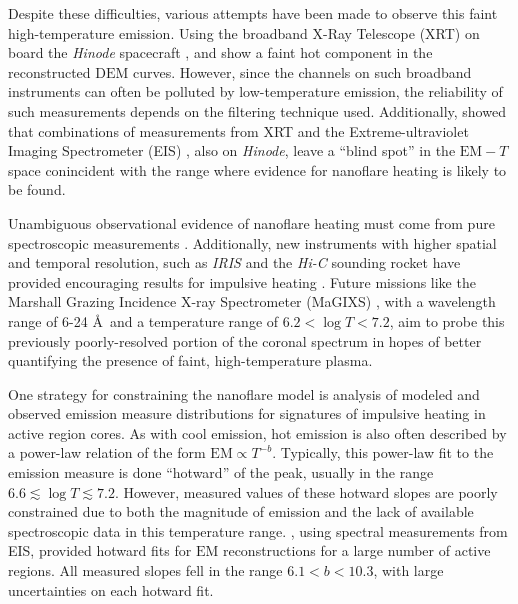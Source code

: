 \documentclass[apj]{emulateapj}
\newcommand{\ang}{\AA~}
\begin{document}
	\par Despite these difficulties, various attempts have been made to observe this faint high-temperature emission. Using the broadband X-Ray Telescope (XRT) \citep{golub_x-ray_2007} on board the \textit{Hinode} spacecraft \citep{kosugi_hinode_2007}, \citet{schmelz_hinode_2009} and \citet{reale_evidence_2009} show a faint hot component in the reconstructed $\mathrm{DEM}$ curves. However, since the channels on such broadband instruments can often be polluted by low-temperature emission, the reliability of such measurements depends on the filtering technique used. Additionally, \citet{winebarger_defining_2012} showed that combinations of measurements from XRT and the Extreme-ultraviolet Imaging Spectrometer (EIS) \citep{culhane_euv_2007}, also on  \textit{Hinode}, leave a ``blind spot'' in the $\mathrm{EM}-T$ space conincident with the range where evidence for nanoflare heating is likely to be found. 
	\par Unambiguous observational evidence of nanoflare heating must come from pure spectroscopic measurements \citep[see][]{brosius_pervasive_2014}. Additionally, new instruments with higher spatial and temporal resolution, such as \textit{IRIS} \citep{de_pontieu_interface_2014} and the \textit{Hi-C} sounding rocket \citep{cirtain_energy_2013} have provided encouraging results for impulsive heating \citep{testa_observing_2013,testa_evidence_2014}. Future missions like the Marshall Grazing Incidence X-ray Spectrometer (MaGIXS) \citep{kobayashi_marshall_2011,winebarger_new_2014}, with a wavelength range of 6-24 \ang and a temperature range of $6.2<\log{T}<7.2$, aim to probe this previously poorly-resolved portion of the coronal spectrum in hopes of better quantifying the presence of faint, high-temperature plasma.
	\par One strategy for constraining the nanoflare model is analysis of modeled and observed emission measure distributions for signatures of impulsive heating in active region cores. As with cool emission, hot emission is also often described by a power-law relation of the form $\mathrm{EM}\propto T^{-b}$. Typically, this power-law fit to the emission measure is done ``hotward'' of the peak, usually in the range $6.6\lesssim\log{T}\lesssim7.2$. However, measured values of these hotward slopes are poorly constrained due to both the magnitude of emission and the lack of available spectroscopic data in this temperature range. \citet{warren_systematic_2012}, using spectral measurements from EIS, provided hotward fits for $\mathrm{EM}$ reconstructions for a large number of active regions. All measured slopes fell in the range $6.1<b<10.3$, with large uncertainties on each hotward fit.
\end{document}
